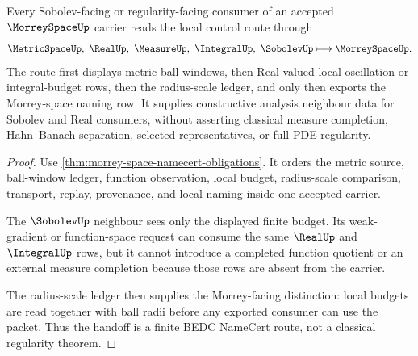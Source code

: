 \begin{theorem}
\label{thm:morrey-space-sobolev-neighbour-handoff}
Every Sobolev-facing or regularity-facing consumer of an accepted $\MorreySpaceUp$ carrier reads the local control route through
$$
\MetricSpaceUp,\ \RealUp,\ \MeasureUp,\ \IntegralUp,\ \SobolevUp
\longmapsto
\MorreySpaceUp .
$$
The route first displays metric-ball windows, then Real-valued local oscillation or integral-budget rows, then the radius-scale ledger, and only then exports the Morrey-space naming row. It supplies constructive analysis neighbour data for Sobolev and Real consumers, without asserting classical measure completion, Hahn--Banach separation, selected representatives, or full PDE regularity.
\end{theorem}
\begin{proof}
Use \autoref{thm:morrey-space-namecert-obligations}. It orders the metric source, ball-window ledger, function observation, local budget, radius-scale comparison, transport, replay, provenance, and local naming inside one accepted carrier.

The $\SobolevUp$ neighbour sees only the displayed finite budget. Its weak-gradient or function-space request can consume the same $\RealUp$ and $\IntegralUp$ rows, but it cannot introduce a completed function quotient or an external measure completion because those rows are absent from the carrier.

The radius-scale ledger then supplies the Morrey-facing distinction: local budgets are read together with ball radii before any exported consumer can use the packet. Thus the handoff is a finite BEDC NameCert route, not a classical regularity theorem.
\end{proof}


\begin{closurestatus}{\MorreySpaceUp}
  \theoryclosure{\seedClosure}
  \formalstatus{\unformalizedV}
\end{closurestatus}
